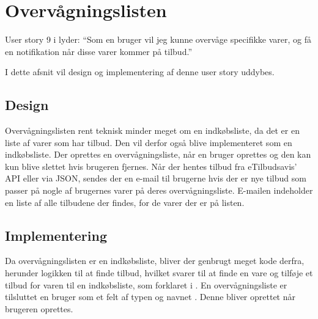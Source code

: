 \section{Overvågningslisten}

User story 9 i  lyder: ``Som en bruger vil jeg kunne overvåge specifikke varer, og få en notifikation når disse varer kommer på tilbud.''

I dette afsnit vil design og implementering af denne user story uddybes.

\subsection{Design}

Overvågningslisten rent teknisk minder meget om en indkøbsliste, da det er en liste af varer som har tilbud.
Den vil derfor også blive implementeret som en indkøbsliste. 
Der oprettes en overvågningsliste, når en bruger oprettes og den kan kun blive slettet hvis brugeren fjernes.
Når der hentes tilbud fra eTilbudsavis' API eller via JSON, sendes der en e-mail til brugerne hvis der er nye tilbud som passer på nogle af brugernes varer på deres overvågningsliste. 
E-mailen indeholder en liste af alle tilbudene der findes, for de varer der er på listen.

\subsection{Implementering} 

Da overvågningslisten er en indkøbsliste, bliver der genbrugt meget kode derfra, herunder logikken til at finde tilbud, hvilket svarer til at finde en vare og tilføje et tilbud for varen til en indkøbsliste, som forklaret i .
En overvågningsliste er tilsluttet en bruger som et felt af typen  og navnet . 
Denne  bliver oprettet når brugeren oprettes.

